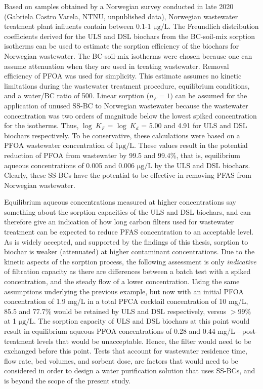 Based on samples obtained by a Norwegian survey conducted in late 2020 (Gabriela Castro Varela, NTNU, unpublished data), Norwegian wastewater treatment plant influents contain between 0.1-1 $\mathrm{\mu g/L}$. The Freundlich distribution coefficients derived for the ULS and DSL biochars from the BC-soil-mix sorption isotherms can be used to estimate the sorption efficiency of the biochars for Norwegian wastewater. The BC-soil-mix isotherms were chosen because one can assume attenuation when they are used in treating wastewater. Removal efficiency of PFOA was used for simplicity. This estimate assumes no kinetic limitations during the wastewater treatment procedure, equilibrium conditions, and a water/BC ratio of 500. Linear sorption ($n_F = 1)$ can be assumed for the application of unused SS-BC to Norwegian wastewater because the wastewater concentration was two orders of magnitude below the lowest spiked concentration for the isotherms. Thus, $\log~K_F$ = $\log~K_d$ = 5.00 and 4.91 for ULS and DSL biochars respectively. To be conservative, these calculations were based on a PFOA wastewater concentration of $1 \mathrm{\mu g/L}$. These values result in the potential reduction of PFOA from wastewater by 99.5 and 99.4\%, that is, equilibrium aqueous concentrations of 0.005 and 0.006 $\mathrm{\mu g/L}$ by the ULS and DSL biochars. Clearly, these SS-BCs have the potential to be effective in removing PFAS from Norwegian wastewater. 

Equilibrium aqueous concentrations measured at higher concentrations say something about the sorption capacities of the ULS and DSL biochars, and can therefore give an indication of how long carbon filters used for wastewater treatment can be expected to reduce PFAS concentration to an acceptable level. As is widely accepted, and supported by the findings of this thesis, sorption to biochar is weaker (attenuated) at higher contaminant concentrations. Due to the kinetic aspects of the sorption process, the following assessment is only \textit{indicative} of filtration capacity as there are differences between a batch test with a spiked concentration, and the steady flow of a lower concentration. Using the same assumptions underlying the previous example, but now with an initial PFOA concentration of 1.9 mg/L in a total PFCA cocktail concentration of 10 mg/L, 85.5 and 77.7\% would be retained by ULS and DSL respectively, versus $>$99\% at 1 $\mathrm{\mu g/L}$. The sorption capacity of ULS and DSL biochars at this point would result in equilibrium aqueous PFOA concentrations of 0.28 and 0.44 mg/L---post-treatment levels that would be unacceptable. Hence, the filter would need to be exchanged before this point. Tests that account for wastewater residence time, flow rate, bed volumes, and sorbent dose, are factors that would need to be considered in order to design a water purification solution that uses SS-BCs, and is beyond the scope of the present study. 

